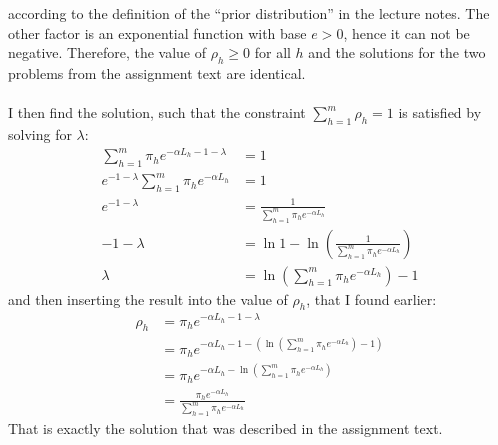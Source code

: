 \documentclass[a4paper]{article}
\begin{document}
according to the definition of the ``prior distribution'' in the lecture notes.
The other factor is an exponential function with base $e>0$,
hence it can not be negative. Therefore, the value of $\rho_h \geq 0$ for all
$h$ and the solutions for the two problems from the assignment text are
identical. \\\\
I then find the solution, such that the constraint $\sum_{h=1}^m \rho_h = 1$ is
satisfied by solving for $\lambda$:
\begin{align*}
  \sum_{h=1}^m\pi_{h}e^{-\alpha L_{h} - 1 - \lambda} &= 1\\
  e^{ - 1 - \lambda}\sum_{h=1}^m\pi_{h}e^{-\alpha L_{h}} &= 1\\
  e^{ - 1 - \lambda} &= \frac{1}{\sum_{h=1}^m\pi_{h}e^{-\alpha L_{h}}}\\
  - 1 - \lambda &= \ln{1} - \ln\left(\frac{1}{\sum_{h=1}^m\pi_{h}e^{-\alpha L_{h}}} \right)\\
  \lambda &= \ln\left(\sum_{h=1}^m\pi_{h}e^{-\alpha L_{h}}\right) - 1
\end{align*}
and then inserting the result into the value of $\rho_h$, that I found earlier:
\begin{align*}
  \rho_{h} &= \pi_{h}e^{-\alpha L_{h} - 1 - \lambda} \\
  &= \pi_{h}e^{-\alpha L_{h} - 1 - (\ln\left(\sum_{h=1}^m\pi_{h}e^{-\alpha L_{h}}\right) - 1)} \\
  &= \pi_{h}e^{-\alpha L_{h} - \ln\left(\sum_{h=1}^m\pi_{h}e^{-\alpha L_{h}}\right)} \\
  &= \frac{\pi_{h}e^{-\alpha L_{h}}}{\sum_{h=1}^m\pi_{h}e^{-\alpha L_{h}}}
\end{align*}
That is exactly the solution that was described in the assignment text.
\end{document}
